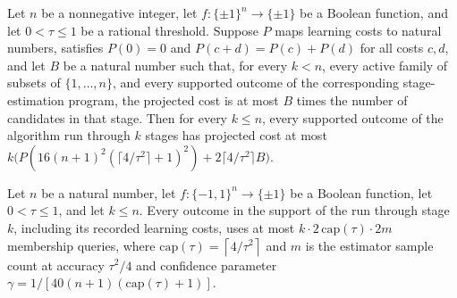 \begin{theorem}
\label{FABL.goldreichLevinQueryRunUpTo_costProjection_le}
\leanok
{}
Let $n$ be a nonnegative integer, let $f:\{\pm1\}^n\to\{\pm1\}$ be a Boolean function,
and let $0<\tau\le1$ be a rational threshold. Suppose $P$ maps learning costs to natural
numbers, satisfies $P(0)=0$ and $P(c+d)=P(c)+P(d)$ for all costs $c,d$, and let $B$ be a
natural number such that, for every $k<n$, every active family of subsets of
$\{1,\ldots,n\}$, and every supported outcome of the corresponding stage-estimation
program, the projected cost is at most $B$ times the number of candidates in that stage.
Then for every $k\le n$, every supported outcome of the algorithm run through $k$ stages
has projected cost at most
$k\bigl(P(16(n+1)^2(\lceil4/\tau^2\rceil+1)^2)+2\lceil4/\tau^2\rceil B\bigr)$.
\end{theorem}

\begin{theorem}
\label{FABL.goldreichLevinQueryRunUpTo_queries_le}
\leanok
{}
Let $n$ be a natural number, let $f:\{-1,1\}^n\to\{\pm1\}$ be a Boolean function, let
$0<\tau\le 1$, and let $k\le n$. Every outcome in the support of the run through stage
$k$, including its recorded learning costs, uses at most $k\cdot
2\,\mathrm{cap}(\tau)\cdot 2m$ membership queries, where
$\mathrm{cap}(\tau)=\left\lceil4/\tau^2\right\rceil$ and $m$ is the estimator sample
count at accuracy $\tau^2/4$ and confidence parameter
$\gamma=1/[40(n+1)(\mathrm{cap}(\tau)+1)]$.
\end{theorem}

